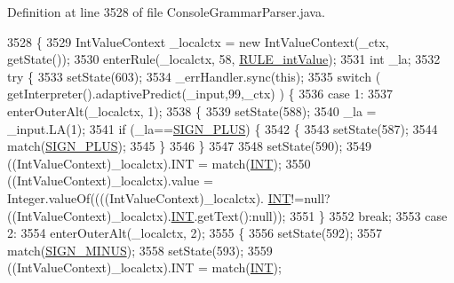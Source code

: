 Definition at line 3528 of file Console\+Grammar\+Parser.\+java.


\begin{DoxyCode}
3528                                                                       \{
3529     IntValueContext \_localctx = \textcolor{keyword}{new} IntValueContext(\_ctx, getState());
3530     enterRule(\_localctx, 58, \hyperlink{classgov_1_1nasa_1_1jpf_1_1inspector_1_1client_1_1parser_1_1_console_grammar_parser_a884ea99dccf01df611fbb266001b411d}{RULE\_intValue});
3531     \textcolor{keywordtype}{int} \_la;
3532     \textcolor{keywordflow}{try} \{
3533       setState(603);
3534       \_errHandler.sync(\textcolor{keyword}{this});
3535       \textcolor{keywordflow}{switch} ( getInterpreter().adaptivePredict(\_input,99,\_ctx) ) \{
3536       \textcolor{keywordflow}{case} 1:
3537         enterOuterAlt(\_localctx, 1);
3538         \{
3539         setState(588);
3540         \_la = \_input.LA(1);
3541         \textcolor{keywordflow}{if} (\_la==\hyperlink{classgov_1_1nasa_1_1jpf_1_1inspector_1_1client_1_1parser_1_1_console_grammar_parser_ac2a6ae73b3b6ce7feef07c1b4866af05}{SIGN\_PLUS}) \{
3542           \{
3543           setState(587);
3544           match(\hyperlink{classgov_1_1nasa_1_1jpf_1_1inspector_1_1client_1_1parser_1_1_console_grammar_parser_ac2a6ae73b3b6ce7feef07c1b4866af05}{SIGN\_PLUS});
3545           \}
3546         \}
3547 
3548         setState(590);
3549         ((IntValueContext)\_localctx).INT = match(\hyperlink{classgov_1_1nasa_1_1jpf_1_1inspector_1_1client_1_1parser_1_1_console_grammar_parser_abd77a1befc3eca91ef4ffb5856126df5}{INT});
3550          ((IntValueContext)\_localctx).value =   Integer.valueOf((((IntValueContext)\_localctx).
      \hyperlink{classgov_1_1nasa_1_1jpf_1_1inspector_1_1client_1_1parser_1_1_console_grammar_parser_abd77a1befc3eca91ef4ffb5856126df5}{INT}!=null?((IntValueContext)\_localctx).\hyperlink{classgov_1_1nasa_1_1jpf_1_1inspector_1_1client_1_1parser_1_1_console_grammar_parser_abd77a1befc3eca91ef4ffb5856126df5}{INT}.getText():null)); 
3551         \}
3552         \textcolor{keywordflow}{break};
3553       \textcolor{keywordflow}{case} 2:
3554         enterOuterAlt(\_localctx, 2);
3555         \{
3556         setState(592);
3557         match(\hyperlink{classgov_1_1nasa_1_1jpf_1_1inspector_1_1client_1_1parser_1_1_console_grammar_parser_a48b3f6921fee5d663dafe240074dac66}{SIGN\_MINUS});
3558         setState(593);
3559         ((IntValueContext)\_localctx).INT = match(\hyperlink{classgov_1_1nasa_1_1jpf_1_1inspector_1_1client_1_1parser_1_1_console_grammar_parser_abd77a1befc3eca91ef4ffb5856126df5}{INT});

\end{DoxyCode}
